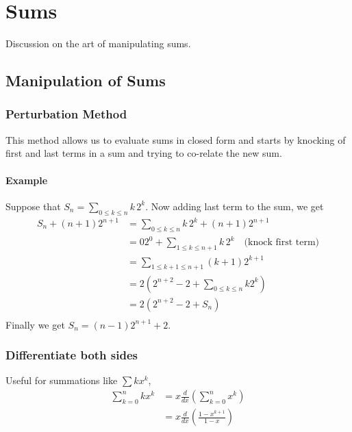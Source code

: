 \chapter{Sums}
Discussion on the art of manipulating sums.

\section{Manipulation of Sums}
\subsection{Perturbation Method}
This method allows us to evaluate sums in closed form and starts by knocking of first and last terms in a sum and trying to co-relate the new sum.

\subsubsection{Example}
Suppose that $S_n = \sum_{0 \le k \le n}k\,2^k$. Now adding last term to the sum, we get
\begin{align*}
S_n + (n+1)2^{n+1} &= \sum_{0\le k \le n}k\,2^k + (n+1)2^{n+1} \\
    &= 02^0 + \sum_{1 \le k \le n+1}k\,2^k \quad \text{(knock first term)}\\
    &= \sum_{1 \le k+1 \le n+1} (k+1)2^{k+1} \\
    &= 2 \left(2^{n+2}-2 + \sum_{0\le k \le n} k2^k \right) \\
    &= 2 \left(2^{n+2}-2+S_n \right)\\
\end{align*}
Finally we get $S_n = (n-1)2^{n+1}+2$.

\subsection{Differentiate both sides}
Useful for summations like $\sum kx^k$,
\begin{align*}
    \sum_{k=0}^n kx^k &= x \frac{d}{dx}\left(\sum_{k=0}^nx^k\right) \\
    &= x \frac{d}{dx}\left(\frac{1-x^{k+1}}{1-x}\right)
\end{align*}